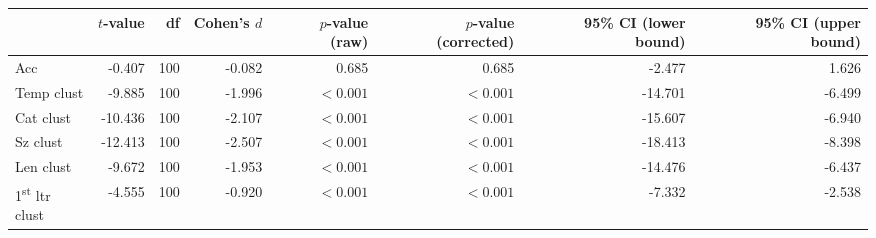 \begin{tabular}{lrrrrrrr}
\toprule
 & $t$-value & df & Cohen's $d$ & $p$-value (raw) & $p$-value (corrected) & 95\% CI (lower bound) & 95\% CI (upper bound) \\
\midrule
 Acc & -0.407 & 100 & -0.082 & 0.685 & 0.685 & -2.477 & 1.626 \\
\rowcolor[HTML]{fffee3} Temp clust & -9.885 & 100 & -1.996 & $< 0.001$ & $< 0.001$ & -14.701 & -6.499 \\
\rowcolor[HTML]{fffee3} Cat clust & -10.436 & 100 & -2.107 & $< 0.001$ & $< 0.001$ & -15.607 & -6.940 \\
\rowcolor[HTML]{fffee3} Sz clust & -12.413 & 100 & -2.507 & $< 0.001$ & $< 0.001$ & -18.413 & -8.398 \\
\rowcolor[HTML]{fffee3} Len clust & -9.672 & 100 & -1.953 & $< 0.001$ & $< 0.001$ & -14.476 & -6.437 \\
\rowcolor[HTML]{fffee3} 1\textsuperscript{st} ltr clust & -4.555 & 100 & -0.920 & $< 0.001$ & $< 0.001$ & -7.332 & -2.538 \\
\bottomrule
\end{tabular}